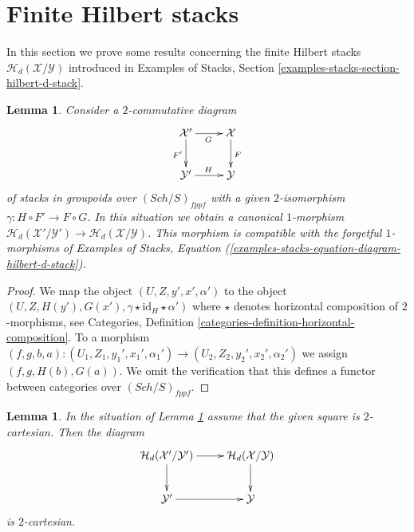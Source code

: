 \documentclass{stacks-project}
\theoremstyle{plain}
\newtheorem{lemma}[subsection]{Lemma}
\theoremstyle{definition}
\theoremstyle{remark}
\numberwithin{equation}{subsection}
\def\Sch{\mathit{Sch}}
\begin{document}
\section{Finite Hilbert stacks}
\label{section-finite-hilbert-stacks}

\noindent
In this section we prove some results concerning the finite
Hilbert stacks $\mathcal{H}_d(\mathcal{X}/\mathcal{Y})$
introduced in
Examples of Stacks, Section \ref{examples-stacks-section-hilbert-d-stack}.

\begin{lemma}
\label{lemma-map-hilbert}
Consider a $2$-commutative diagram
$$
\xymatrix{
\mathcal{X}' \ar[r]_G \ar[d]_{F'} & \mathcal{X} \ar[d]^F \\
\mathcal{Y}' \ar[r]^H & \mathcal{Y}
}
$$
of stacks in groupoids over $(\Sch/S)_{fppf}$ with a given
$2$-isomorphism $\gamma : H \circ F' \to F \circ G$. In this situation we
obtain a canonical $1$-morphism
$\mathcal{H}_d(\mathcal{X}'/\mathcal{Y}') \to
\mathcal{H}_d(\mathcal{X}/\mathcal{Y})$.
This morphism is compatible with the forgetful $1$-morphisms of
Examples of Stacks,
Equation (\ref{examples-stacks-equation-diagram-hilbert-d-stack}).
\end{lemma}

\begin{proof}
We map the object $(U, Z, y', x', \alpha')$ to the object
$(U, Z, H(y'), G(x'), \gamma \star \text{id}_H \star \alpha')$
where $\star$ denotes horizontal composition of $2$-morphisms, see
Categories, Definition \ref{categories-definition-horizontal-composition}.
To a morphism
$(f, g, b, a) :
(U_1, Z_1, y_1', x_1', \alpha_1') \to (U_2, Z_2, y_2', x_2', \alpha_2')$
we assign
$(f, g, H(b), G(a))$.
We omit the verification that this defines a functor between categories over
$(\Sch/S)_{fppf}$.
\end{proof}

\begin{lemma}
\label{lemma-cartesian-map-hilbert}
In the situation of
Lemma \ref{lemma-map-hilbert}
assume that the given square is $2$-cartesian. Then the diagram
$$
\xymatrix{
\mathcal{H}_d(\mathcal{X}'/\mathcal{Y}') \ar[r] \ar[d] &
\mathcal{H}_d(\mathcal{X}/\mathcal{Y}) \ar[d] \\
\mathcal{Y}' \ar[r] &
\mathcal{Y}
}
$$
is $2$-cartesian.
\end{lemma}
\end{document}
